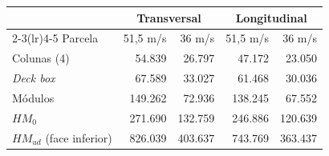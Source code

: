 \begin{tabular}{lrrrr}
\toprule
 & \multicolumn{2}{c}{Transversal} & \multicolumn{2}{c}{Longitudinal} \\
\cmidrule(lr){2-3}\cmidrule(lr){4-5}
Parcela & 51,5 m/s & 36 m/s & 51,5 m/s & 36 m/s \\
\midrule
Colunas (4) & 54.839 & 26.797 & 47.172 & 23.050 \\
\emph{Deck box} & 67.589 & 33.027 & 61.468 & 30.036 \\
Módulos & 149.262 & 72.936 & 138.245 & 67.552 \\
\midrule
$HM_0$ & 271.690 & 132.759 & 246.886 & 120.639 \\
$HM_{ud}$ (face inferior) & 826.039 & 403.637 & 743.769 & 363.437 \\
\bottomrule
\end{tabular}
